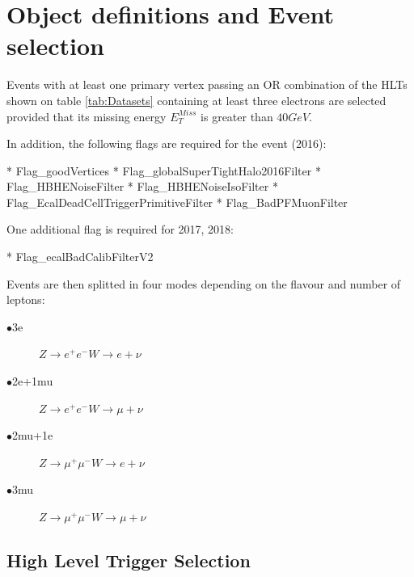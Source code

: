 \section{Object definitions and Event selection}

Events with at least one primary vertex passing an OR combination
of the HLTs shown on table \ref{tab:Datasets} containing at least three
electrons are selected provided that its missing energy $E_T^{Miss}$ is
greater than $40GeV$.

In addition, the following flags are required for the event (2016):

* Flag\_goodVertices
* Flag\_globalSuperTightHalo2016Filter
* Flag\_HBHENoiseFilter
* Flag\_HBHENoiseIsoFilter
* Flag\_EcalDeadCellTriggerPrimitiveFilter
* Flag\_BadPFMuonFilter

One additional flag is required for 2017, 2018:

* Flag\_ecalBadCalibFilterV2

Events are then splitted in four modes depending on the flavour and
number of leptons:

\begin{description}
\item[$\bullet$3e] $Z\rightarrow e^{+}e^{-} W\rightarrow e+\nu$
\item[$\bullet$2e+1mu] $Z\rightarrow e^{+}e^{-} W\rightarrow \mu+\nu$
\item[$\bullet$2mu+1e] $Z\rightarrow \mu^{+}\mu^{-} W\rightarrow e+\nu$
\item[$\bullet$3mu] $Z\rightarrow \mu^{+}\mu^{-} W\rightarrow \mu+\nu$
\end{description}


\subsection{High Level Trigger Selection}


